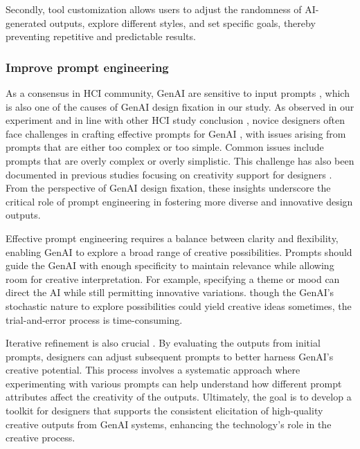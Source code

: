 Secondly, tool customization allows users to adjust the randomness of AI-generated outputs, explore different styles, and set specific goals, thereby preventing repetitive and predictable results. \cite{liu2022design} %


\subsubsection{Improve prompt engineering}
As a consensus in HCI community, GenAI are sensitive to input prompts \cite{wu2022ai}, which is also one of the causes of GenAI design fixation in our study. As observed in our experiment and in line with other HCI study conclusion , novice designers often face challenges in crafting effective prompts for GenAI \cite{zamfirescu2023johnny}, with issues arising from prompts that are either too complex or too simple. Common issues include prompts that are overly complex or overly simplistic. This challenge has also been documented in previous studies focusing on creativity support for designers \cite{chen2024designfusion, liu2022design}. From the perspective of GenAI design fixation, these insights underscore the critical role of prompt engineering in fostering more diverse and innovative design outputs.

Effective prompt engineering requires a balance between clarity and flexibility, enabling GenAI to explore a broad range of creative possibilities. Prompts should guide the GenAI with enough specificity to maintain relevance while allowing room for creative interpretation. For example, specifying a theme or mood can direct the AI while still permitting innovative variations.
though the GenAI's stochastic nature to explore possibilities could yield creative ideas sometimes, the trial-and-error process is time-consuming.

Iterative refinement is also crucial \cite{mahdavi2024ai}. By evaluating the outputs from initial prompts, designers can adjust subsequent prompts to better harness GenAI’s creative potential. This process involves a systematic approach where experimenting with various prompts can help understand how different prompt attributes affect the creativity of the outputs. Ultimately, the goal is to develop a toolkit for designers that supports the consistent elicitation of high-quality creative outputs from GenAI systems, enhancing the technology’s role in the creative process.

